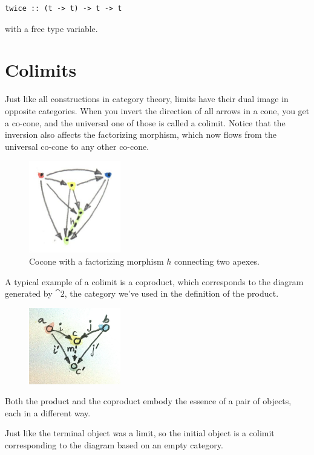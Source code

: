 \begin{Verbatim}
twice :: (t -> t) -> t -> t
\end{Verbatim}
with  a free type variable.

\section{Colimits}

Just like all constructions in category theory, limits have their dual
image in opposite categories. When you invert the direction of all
arrows in a cone, you get a co-cone, and the universal one of those is
called a colimit. Notice that the inversion also affects the factorizing
morphism, which now flows from the universal co-cone to any other
co-cone.

\begin{figure}[H]
\centering
\includegraphics[width=40mm]{images/colimit.jpg}
\caption{Cocone with a factorizing morphism $h$ connecting two apexes.}
\end{figure}

\noindent
A typical example of a colimit is a coproduct, which corresponds to the
diagram generated by $\cat{2}$, the category we've used in the
definition of the product.

\begin{figure}[H]
\centering
\includegraphics[width=40mm]{images/coproductranking.jpg}
\end{figure}

\noindent
Both the product and the coproduct embody the essence of a pair of
objects, each in a different way.

Just like the terminal object was a limit, so the initial object is a
colimit corresponding to the diagram based on an empty category.

